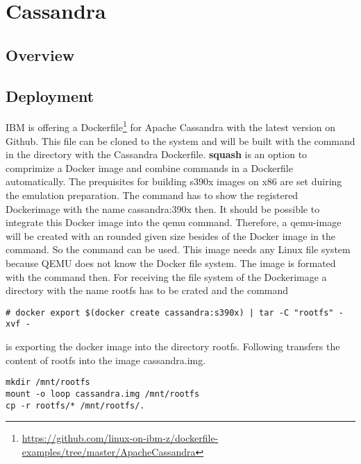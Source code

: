 \chapter{Cassandra}\label{ch:cassandra}

\section{Overview}

\section{Deployment}

IBM is offering a Dockerfile\footnote{\url{https://github.com/linux-on-ibm-z/dockerfile-examples/tree/master/ApacheCassandra}} for Apache Cassandra with the latest version on Github. This file can be cloned to the system and will be built with the command  in the directory with the Cassandra Dockerfile. \textbf{squash} is an option to comprimize a Docker image and combine commands in a Dockerfile automatically. The prequisites for building s390x images on x86 are set duiring the emulation preparation. The command  has to show the registered Dockerimage with the name cassandra:390x then. It should be possible to integrate this Docker image into the qemu command. Therefore, a qemu-image will be created with an rounded given size besides of the Docker image in the  command. So the command  can be used. This image needs any Linux file system because QEMU does not know the Docker file system. The image is formated with the command  then. For receiving the file system of the Dockerimage a directory with the name rootfs has to be crated and the command
\begin{lstlisting}[style=BashInputStyle]
# docker export $(docker create cassandra:s390x) | tar -C "rootfs" -xvf -
 \end{lstlisting}
 is exporting the docker image into the directory rootfs. Following transfers the content of rootfs into the image cassandra.img.

\begin{lstlisting}[style=BashInputStyle]
mkdir /mnt/rootfs
mount -o loop cassandra.img /mnt/rootfs
cp -r rootfs/* /mnt/rootfs/.
 \end{lstlisting}

